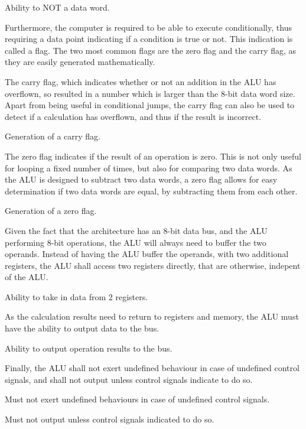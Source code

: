\begin{feat-requirement}
  Ability to NOT a data word.
\end{feat-requirement}

Furthermore, the computer is required to be able to execute conditionally, thus requiring a data point indicating if a condition is true or not. This indication is called a flag. The two most common flags are the zero flag and the carry flag, as they are easily generated mathematically. 

The carry flag, which indicates whether or not an addition in the ALU has overflown, so resulted in a number which is larger than the 8-bit data word size. Apart from being useful in conditional jumps, the carry flag can also be used to detect if a calculation has overflown, and thus if the result is incorrect.

\begin{turing-requirement}
  Generation of a carry flag. 
\end{turing-requirement}

The zero flag indicates if the result of an operation is zero. This is not only useful for looping a fixed number of times, but also for comparing two data words. As the ALU is designed to subtract two data words, a zero flag allows for easy determination if two data words are equal, by subtracting them from each other. 

\begin{feat-requirement}
  Generation of a zero flag.
\end{feat-requirement}

Given the fact that the architecture has an 8-bit data bus, and the ALU performing 8-bit operations, the ALU will always need to buffer the two operands. Instead of having the ALU buffer the operands, with two additional registers, the ALU shall access two registers directly, that are otherwise, indepent of the ALU.
\begin{arch-requirement}
  Ability to take in data from 2 registers.
\end{arch-requirement}

As the calculation results need to return to registers and memory, the ALU must have the ability to output data to the bus.
\begin{arch-requirement}
  Ability to output operation results to the bus. 
\end{arch-requirement}

Finally, the ALU shall not exert undefined behaviour in case of undefined control signals, and shall not output unless control signals indicate to do so. 

\begin{feat-requirement} \label{req:alu-undef-behavior}
  Must not exert undefined behaviours in case of undefined control signals. 
\end{feat-requirement}

\begin{feat-requirement} \label{req:alu-no-output}
  Must not output unless control signals indicated to do so. 
\end{feat-requirement}


